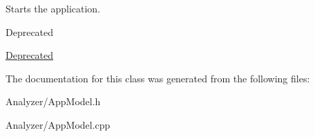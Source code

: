 Starts the application. 

\begin{DoxyRefDesc}{Deprecated}
\item[\hyperlink{deprecated__deprecated000001}{Deprecated}]\end{DoxyRefDesc}


The documentation for this class was generated from the following files\-:\begin{DoxyCompactItemize}
\item 
Analyzer/App\-Model.\-h\item 
Analyzer/App\-Model.\-cpp\end{DoxyCompactItemize}
